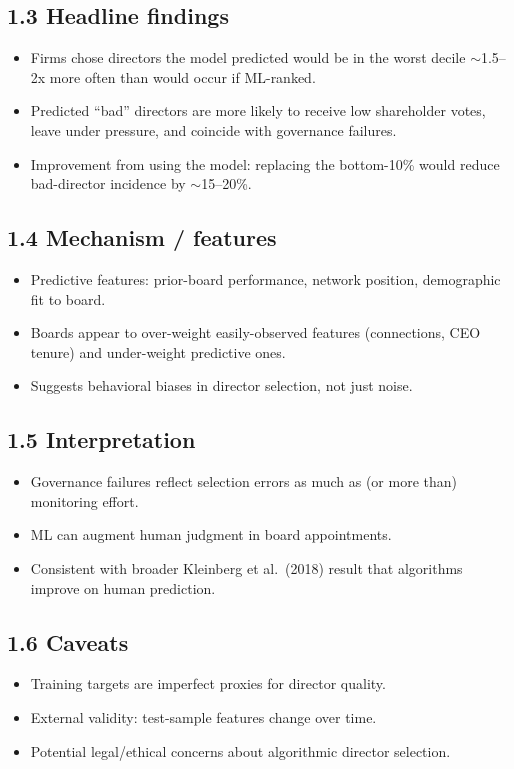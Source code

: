 \documentclass[11pt]{article}
\begin{document}
\subsection*{1.3 Headline findings}
\begin{itemize}
\item Firms chose directors the model predicted would be in the worst decile $\sim$1.5--2x more often than would occur if ML-ranked.
\item Predicted ``bad'' directors are more likely to receive low shareholder votes, leave under pressure, and coincide with governance failures.
\item Improvement from using the model: replacing the bottom-10\% would reduce bad-director incidence by $\sim$15--20\%.
\end{itemize}

\subsection*{1.4 Mechanism / features}
\begin{itemize}
\item Predictive features: prior-board performance, network position, demographic fit to board.
\item Boards appear to over-weight easily-observed features (connections, CEO tenure) and under-weight predictive ones.
\item Suggests behavioral biases in director selection, not just noise.
\end{itemize}

\subsection*{1.5 Interpretation}
\begin{itemize}
\item Governance failures reflect selection errors as much as (or more than) monitoring effort.
\item ML can augment human judgment in board appointments.
\item Consistent with broader Kleinberg et al.\ (2018) result that algorithms improve on human prediction.
\end{itemize}

\subsection*{1.6 Caveats}
\begin{alertbox}
\begin{itemize}
\item Training targets are imperfect proxies for director quality.
\item External validity: test-sample features change over time.
\item Potential legal/ethical concerns about algorithmic director selection.
\end{itemize}
\end{alertbox}
\end{document}

